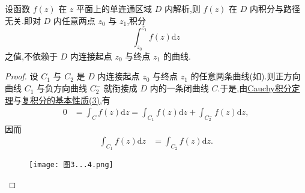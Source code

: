 \documentclass[../../main.tex]{subfiles}
\begin{document}
\begin{corollary}\label{corollary:复积分的积分与路径无关}
设函数 $f(z)$ 在 $z$ 平面上的单连通区域 $D$ 内解析,则 $f(z)$ 在 $D$ 内积分与路径无关.即对 $D$ 内任意两点 $z_0$ 与 $z_1$,积分
$$\int_{z_0}^{z_1} f(z) \mathrm{d}z$$
之值,不依赖于 $D$ 内连接起点 $z_0$ 与终点 $z_1$ 的曲线.
\end{corollary}
\begin{proof}
设 $C_1$ 与 $C_2$ 是 $D$ 内连接起点 $z_0$ 与终点 $z_1$ 的任意两条曲线(如).则正方向曲线 $C_1$ 与负方向曲线 $C_2^-$ 就衔接成 $D$ 内的一条闭曲线 $C$.于是,由\hyperref[theorem:Cauchy-Goursat定理(Cauchy积分定理)]{Cauchy积分定理}与\hyperref[proposition:复积分的基本性质]{复积分的基本性质(3)},有
\begin{align*}
0 &= \int_{C} f(z) \mathrm{d}z = \int_{C_1} f(z) \mathrm{d}z + \int_{C_2^-} f(z) \mathrm{d}z, 
\end{align*}
因而
\begin{align*}
\int_{C_1} f(z) \mathrm{d}z &= \int_{C_2} f(z) \mathrm{d}z. 
\end{align*}
\begin{figure}[H]
\centering
\texttt{[image: 图3...4.png]}
\caption{}
\label{figure:图3...4}
\end{figure}
\end{proof}
\end{document}
